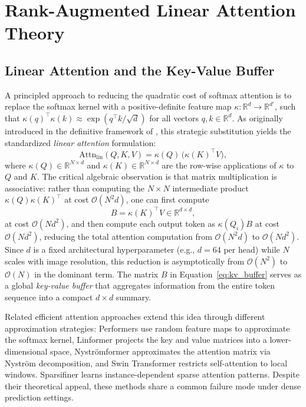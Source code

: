 \section{Rank-Augmented Linear Attention Theory}
\label{sec:rala-theory}

\subsection{Linear Attention and the Key-Value Buffer}

A principled approach to reducing the quadratic cost of softmax attention is to
replace the softmax kernel with a positive-definite feature map
$\kappa: \mathbb{R}^d \to \mathbb{R}^{d'}$, such that 
$\kappa(q)^\top \kappa(k) \approx \exp(q^\top k / \sqrt{d})$ for all vectors
$q, k \in \mathbb{R}^d$. As originally introduced in the definitive framework of
\cite{Katharopoulos2020Linear}, this strategic substitution yields the 
standardized \emph{linear attention} formulation:
\begin{equation}
\mathrm{Attn}_{\mathrm{lin}}(Q, K, V)
    = \kappa(Q)\,\bigl(\kappa(K)^\top V\bigr),
\label{eq:linear_attention}
\end{equation}
where $\kappa(Q) \in \mathbb{R}^{N \times d}$ and
$\kappa(K) \in \mathbb{R}^{N \times d}$ are the row-wise applications of
$\kappa$ to $Q$ and $K$. The critical algebraic observation is that matrix
multiplication is associative: rather than computing the $N \times N$
intermediate product $\kappa(Q)\kappa(K)^\top$ at cost $\mathcal{O}(N^2 d)$,
one can first compute
\begin{equation}
B = \kappa(K)^\top V \in \mathbb{R}^{d \times d},
\label{eq:kv_buffer}
\end{equation}
at cost $\mathcal{O}(N d^2)$, and then compute each output token as
$\kappa(Q_i) B$ at cost $\mathcal{O}(N d^2)$, reducing the total attention
computation from $\mathcal{O}(N^2 d)$ to $\mathcal{O}(N d^2)$. Since $d$ is
a fixed architectural hyperparameter (e.g., $d = 64$ per head) while
$N$ scales with image resolution, this reduction is asymptotically from
$\mathcal{O}(N^2)$ to $\mathcal{O}(N)$ in the dominant term. The matrix $B$
in Equation~\ref{eq:kv_buffer} serves as a global \emph{key-value buffer}
that aggregates information from the entire token sequence into a compact
$d \times d$ summary.

Related efficient attention approaches extend this idea through different
approximation strategies: Performers \cite{Choromanski2021Performer} use random
feature maps to approximate the softmax kernel, Linformer
\cite{Wang2020Linformer} projects the key and value matrices into a
lower-dimensional space, Nystr\"{o}mformer \cite{Xiong2021Nystromformer}
approximates the attention matrix via Nystr\"{o}m decomposition, and Swin
Transformer \cite{Liu2021Swin} restricts self-attention to local windows.
Sparsifiner \cite{Wei2023Sparsifiner} learns instance-dependent sparse
attention patterns. Despite their theoretical appeal, these methods share a
common failure mode under dense prediction settings.

